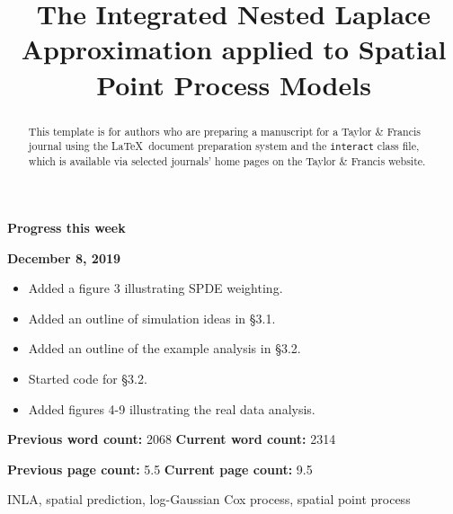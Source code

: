 \documentclass[]{interact}
\begin{document}
{\Large\bf Progress this week}

{\large\bf December 8, 2019}

\begin{itemize}

\item Added a figure 3 illustrating SPDE weighting.

\item Added an outline of simulation ideas in \S 3.1.

\item Added an outline of the example analysis in \S 3.2.

\item Started code for \S 3.2.

\item Added figures 4-9 illustrating the real data analysis.

\end{itemize}

\vfill

\textbf{Previous word count:} 2068 \hfill \textbf{Current word count:} 2314

\textbf{Previous page count:} 5.5 \hfill \textbf{Current page count:} 9.5

\pagebreak


\title{The Integrated Nested Laplace Approximation applied to Spatial Point Process Models}

\author{
}

\maketitle

\begin{abstract}
This template is for authors who are preparing a manuscript for a Taylor \& Francis journal using the \LaTeX\ document preparation system and the \texttt{interact} class file, which is available via selected journals' home pages on the Taylor \& Francis website.
\end{abstract}

\begin{keywords}
INLA, spatial prediction, log-Gaussian Cox process, spatial point process
\end{keywords}
\end{document}
